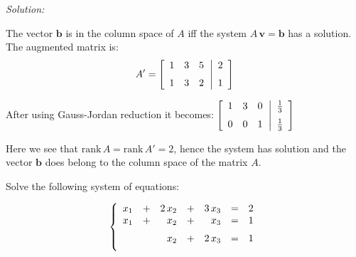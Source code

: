 \documentclass[12pt]{article}
\newcommand{\solution}[2]{\ifthenelse{\boolean{showsol}}%
{\vskip10pt\noindent\emph{Solution:}\vskip10pt #2}{\vskip #1}}
\newcommand{\pnum}[1]{\noindent {\hskip -18pt \bfseries #1.}}
\begin{document}
\solution{2.5in}{\par 
The vector $\mathbf{b}$ is in the column space of $A$ iff the 
system $A\,\mathbf{v} = \mathbf{b}$ has a solution. The augmented 
matrix is:
\[
A' = 
\left [\begin {array}{rrr} 1&3&5\\\noalign{\medskip}1&3&2
\end {array}\right.
\hskip -2pt
\left|
\begin {array}{r} 
2\\\noalign{\medskip}1
\end {array}\right]
\]

After using Gauss-Jordan reduction it becomes:
$\displaystyle{
\left [\begin {array}{rrr} 1&3&0\\\noalign{\medskip}0&0&1
\end {array}\right .
\hskip -2pt
\left|
\begin {array}{r} 
\frac{1}{3}\\\noalign{\medskip}\frac{1}{3}
\end {array}\right]
}$

Here we see that $\mathrm{rank}\,{A} = \mathrm{rank}\,{A'} = 2$, hence
the system has solution and the vector $\mathbf{b}$ does belong to the
column space of the matrix $A$.


}

\clearpage






\pnum{3} Solve the following system of equations:

\[
\left\{
\begin{array}{rrrrrrr}
x_{{1}}&+&2\,x_{{2}}&+&3\,x_{{3}}&=& 2 \\
\medskip 
x_{{1}}&+&x_{{2}}&+&x_{{3}}&=& 1 \\
\medskip 
&&x_{{2}}&+&2\,x_{{3}}&=& 1
\end{array}
\right.
\]
\end{document}

